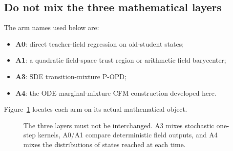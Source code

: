 \documentclass[11pt,a4paper]{article}
\newcommand{\dd}{\mathrm{d}}
\theoremstyle{plain}
\theoremstyle{definition}
\begin{document}
\subsection{Do not mix the three mathematical layers}

The arm names used below are:
\begin{itemize}[leftmargin=1.5em]
\item \textbf{A0}: direct teacher-field regression on old-student states;
\item \textbf{A1}: a quadratic field-space trust region or arithmetic field barycenter;
\item \textbf{A3}: SDE transition-mixture P-OPD;
\item \textbf{A4}: the ODE marginal-mixture CFM construction developed here.
\end{itemize}
Figure~\ref{fig:three-layers} locates each arm on its actual mathematical object.

\begin{figure}[htbp]
\centering
{}
\caption{The three layers must not be interchanged.  A3 mixes stochastic one-step kernels, A0/A1
compare deterministic field outputs, and A4 mixes the distributions of states reached at each
time.}
\label{fig:three-layers}
\end{figure}
\end{document}
